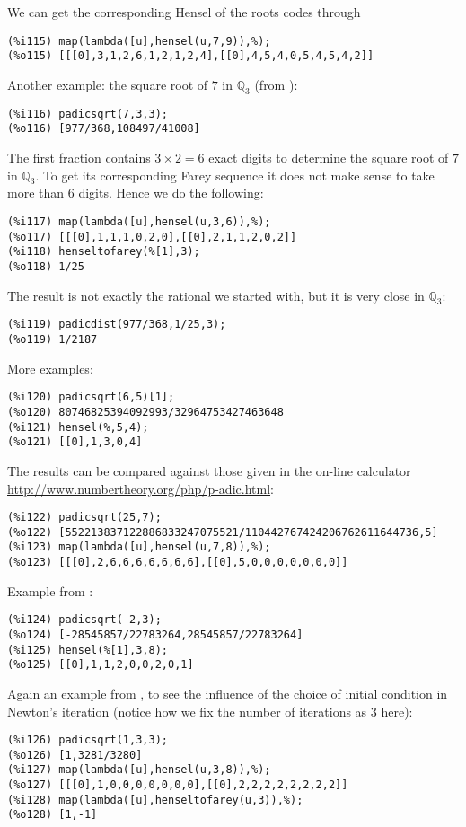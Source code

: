 \documentclass[fleqn]{cas-sc}
\begin{document}
We can get the corresponding Hensel of the roots codes through
\begin{verbatim}
(%i115)	map(lambda([u],hensel(u,7,9)),%);
(%o115)	[[[0],3,1,2,6,1,2,1,2,4],[[0],4,5,4,0,5,4,5,4,2]]
\end{verbatim}

Another example: the square root of $7$ in $\mathbb{Q}_3$ (from \cite{9}):
\begin{verbatim}
(%i116)	padicsqrt(7,3,3);
(%o116)	[977/368,108497/41008]
\end{verbatim}

The first fraction contains $3\times 2=6$ exact digits to determine the square
root of $7$ in $\mathbb{Q}_3$. To get its corresponding Farey sequence it does not
make sense to take more than $6$ digits. Hence we do the following:

\begin{verbatim}
(%i117)	map(lambda([u],hensel(u,3,6)),%);
(%o117)	[[[0],1,1,1,0,2,0],[[0],2,1,1,2,0,2]]
(%i118)	henseltofarey(%[1],3);
(%o118)	1/25
\end{verbatim}

The result is not exactly the rational we started with, but it is very close
in $\mathbb{Q}_3$:
\begin{verbatim}
(%i119)	padicdist(977/368,1/25,3);
(%o119)	1/2187
\end{verbatim}

More examples:
\begin{verbatim}
(%i120)	padicsqrt(6,5)[1];
(%o120)	80746825394092993/32964753427463648
(%i121)	hensel(%,5,4);
(%o121)	[[0],1,3,0,4]
\end{verbatim}

The results can be compared against those given in
the on-line calculator \url{http://www.numbertheory.org/php/p-adic.html}:
\begin{verbatim}
(%i122)	padicsqrt(25,7);
(%o122)	[552213837122886833247075521/110442767424206762611644736,5]
(%i123)	map(lambda([u],hensel(u,7,8)),%);
(%o123)	[[[0],2,6,6,6,6,6,6,6],[[0],5,0,0,0,0,0,0,0]]
\end{verbatim}

Example from \cite{10}:
\begin{verbatim}
(%i124)	padicsqrt(-2,3);
(%o124)	[-28545857/22783264,28545857/22783264]
(%i125)	hensel(%[1],3,8);
(%o125)	[[0],1,1,2,0,0,2,0,1]
\end{verbatim}

Again an example from \cite{9}, to see the influence of the choice of initial condition
in Newton's iteration (notice how we fix the number of iterations as $3$ here):
\begin{verbatim}
(%i126)	padicsqrt(1,3,3);
(%o126)	[1,3281/3280]
(%i127)	map(lambda([u],hensel(u,3,8)),%);
(%o127)	[[[0],1,0,0,0,0,0,0,0],[[0],2,2,2,2,2,2,2,2]]
(%i128)	map(lambda([u],henseltofarey(u,3)),%);
(%o128)	[1,-1]
\end{verbatim}
\end{document}
